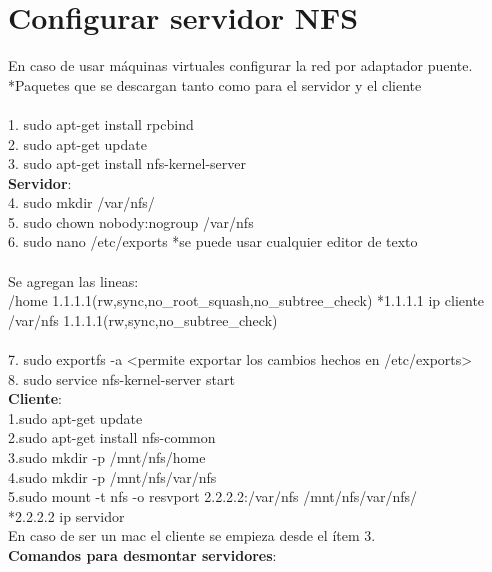 \documentclass[12pt]{article}
\begin{document}
\section{Configurar servidor NFS}

   En caso de usar m\'aquinas virtuales configurar la red por adaptador 
   puente.\\

    *Paquetes que se descargan tanto como para el servidor y el cliente\\
    \\
    1. sudo apt-get install rpcbind\\
    2. sudo apt-get update\\
    3. sudo apt-get install nfs-kernel-server\\

    \textbf{Servidor}:
    \\
    4. sudo mkdir /var/nfs/ \\
    5. sudo chown nobody:nogroup /var/nfs \\ 
    6. sudo nano /etc/exports    *se puede usar cualquier editor de texto\\
    \\
        Se agregan las lineas:\\
        /home 1.1.1.1(rw,sync,no\_root\_squash,no\_subtree\_check)   
        *1.1.1.1 ip cliente\\
        /var/nfs 1.1.1.1(rw,sync,no\_subtree\_check) \\
    \\
    7. sudo exportfs -a
    <permite exportar los cambios hechos en /etc/exports>\\
    8. sudo service nfs-kernel-server start\\

    \textbf{Cliente}:
    \\
    1.sudo apt-get update\\
    2.sudo apt-get install nfs-common\\
    3.sudo mkdir -p /mnt/nfs/home\\
    4.sudo mkdir -p /mnt/nfs/var/nfs\\
    5.sudo mount -t nfs -o resvport 2.2.2.2:/var/nfs /mnt/nfs/var/nfs/  
     \\*2.2.2.2 ip servidor\\

   En caso de ser un mac el cliente se empieza desde el \'item 3.\\


   \textbf{Comandos para desmontar servidores}:\\
\end{document}
